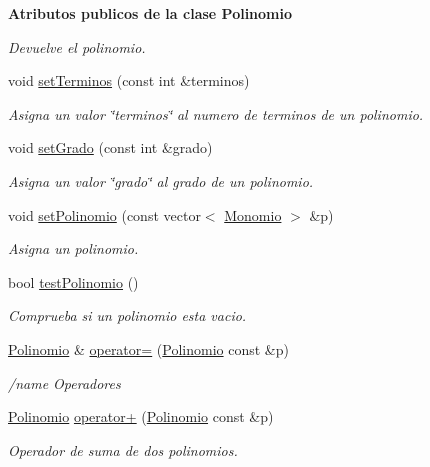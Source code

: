 \begin{Indent}{\bf Atributos publicos de la clase Polinomio}
\begin{DoxyCompactItemize}
\begin{DoxyCompactList}\small\item\em Devuelve el polinomio. \end{DoxyCompactList}\item 
void \hyperlink{classed_1_1Polinomio_acf2aa0cc5b63144eeffc603e6de0d9a3}{set\-Terminos} (const int \&terminos)
\begin{DoxyCompactList}\small\item\em Asigna un valor \char`\"{}terminos\char`\"{} al numero de terminos de un polinomio. \end{DoxyCompactList}\item 
void \hyperlink{classed_1_1Polinomio_a2387bb72b00d6d62daac94a27129d1fe}{set\-Grado} (const int \&grado)
\begin{DoxyCompactList}\small\item\em Asigna un valor \char`\"{}grado\char`\"{} al grado de un polinomio. \end{DoxyCompactList}\item 
void \hyperlink{classed_1_1Polinomio_a76864a912e2301a813c08a51b743fa26}{set\-Polinomio} (const vector$<$ \hyperlink{classed_1_1Monomio}{Monomio} $>$ \&p)
\begin{DoxyCompactList}\small\item\em Asigna un polinomio. \end{DoxyCompactList}\item 
bool \hyperlink{classed_1_1Polinomio_a1a2237c522e6e6907d119d77dcc4aca5}{test\-Polinomio} ()
\begin{DoxyCompactList}\small\item\em Comprueba si un polinomio esta vacio. \end{DoxyCompactList}\item 
\hyperlink{classed_1_1Polinomio}{Polinomio} \& \hyperlink{classed_1_1Polinomio_a324b06e0f0f9fde61625ca4a912962cc}{operator=} (\hyperlink{classed_1_1Polinomio}{Polinomio} const \&p)
\begin{DoxyCompactList}\small\item\em /name Operadores \end{DoxyCompactList}\item 
\hyperlink{classed_1_1Polinomio}{Polinomio} \hyperlink{classed_1_1Polinomio_a71d8e6f2a66622de636cac0b46609164}{operator+} (\hyperlink{classed_1_1Polinomio}{Polinomio} const \&p)
\begin{DoxyCompactList}\small\item\em Operador de suma de dos polinomios. \end{DoxyCompactList}\item 

\end{DoxyCompactItemize}
\end{Indent}
